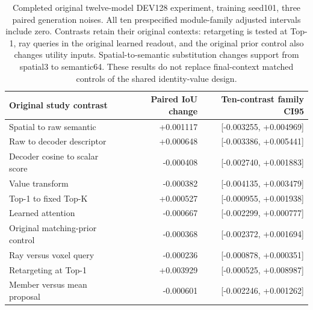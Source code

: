 \begin{table}[t]
\centering\small
\begin{tabular}{lrr}
\toprule
Original study contrast&Paired IoU change&Ten-contrast family CI95\\
\midrule
Spatial to raw semantic&+0.001117&[-0.003255, +0.004969]\\
Raw to decoder descriptor&+0.000648&[-0.003386, +0.005441]\\
Decoder cosine to scalar score&-0.000408&[-0.002740, +0.001883]\\
Value transform&-0.000382&[-0.004135, +0.003479]\\
Top-1 to fixed Top-K&+0.000527&[-0.000955, +0.001938]\\
Learned attention&-0.000667&[-0.002299, +0.000777]\\
Original matching-prior control&-0.000368&[-0.002372, +0.001694]\\
Ray versus voxel query&-0.000236&[-0.000878, +0.000351]\\
Retargeting at Top-1&+0.003929&[-0.000525, +0.008987]\\
Member versus mean proposal&-0.000601&[-0.002246, +0.001262]\\
\bottomrule
\end{tabular}
\caption{Completed original twelve-model DEV128 experiment, training seed101,
three paired generation noises. All ten prespecified module-family adjusted
intervals include zero. Contrasts retain their original contexts: retargeting
is tested at Top-1, ray queries in the original learned readout, and the
original prior control also changes utility inputs. Spatial-to-semantic
substitution changes support from spatial3 to semantic64. These results do
not replace final-context matched controls of the shared identity-value design.}
\label{tab:original-module-effects}
\end{table}
